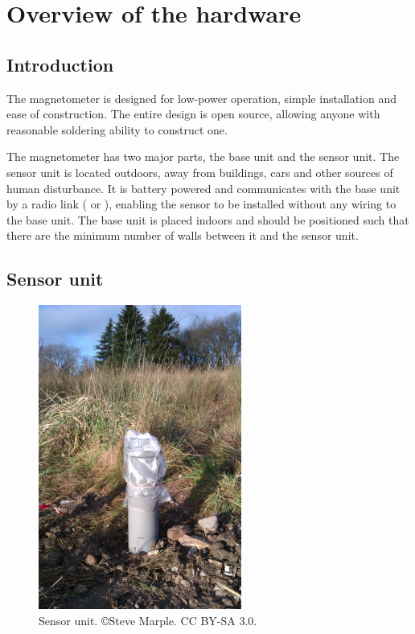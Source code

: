 \chapter{Overview of the hardware}

\section{Introduction}
The magnetometer is designed for low-power operation, simple
installation and ease of construction. The entire design is open
source, allowing anyone with reasonable soldering ability to construct
one.

The magnetometer has two major parts, the base unit and the sensor
unit. The sensor unit is located outdoors, away from buildings, cars
and other sources of human disturbance. It is battery powered and
communicates with the base unit by a radio link ( or
), enabling the sensor to be installed without any wiring
to the base unit. The base unit is placed indoors and should be
positioned such that there are the minimum number of walls between it
and the sensor unit.

\section{Sensor unit}

\begin{figure}
  \centering
  \includegraphics[keepaspectratio,height=10cm]{images/sensor-unit}
  \caption[Sensor unit]%
  {Sensor unit. \small{\copyright Steve Marple. CC BY-SA 3.0.}}
  \label{fig:sensor-unit}
\end{figure}


